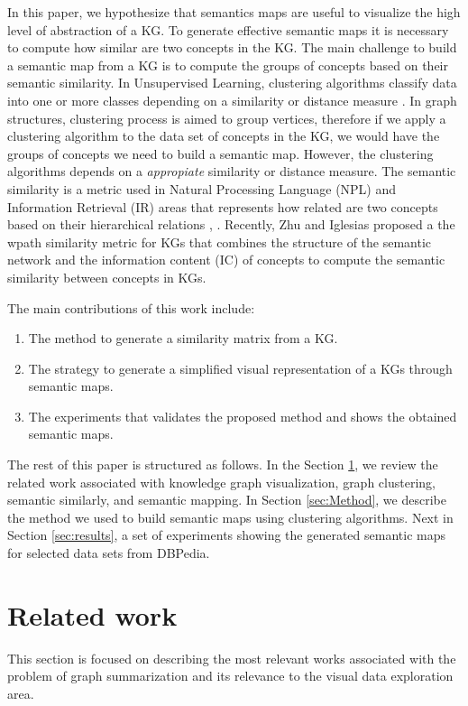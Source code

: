 \documentclass{ieeeaccess}
\begin{document}
In this paper, we hypothesize 
that semantics maps are useful to visualize the high level of abstraction of 
a KG. To generate effective semantic maps it is necessary to compute 
how similar are two concepts in the KG. The main challenge to build a semantic map
from a KG is to compute the groups of concepts based on their 
semantic similarity. In Unsupervised Learning, clustering algorithms classify data into
one or more classes depending on a similarity or distance measure \cite{SCHAEFFER200727}. In
graph structures, clustering process is aimed to group vertices, therefore if we apply a
clustering algorithm to the data set of concepts in the KG, we would have the groups of
concepts we need to build a semantic map. However, the clustering algorithms depends on a
\textit{appropiate} similarity or distance measure. The semantic similarity is a metric used
in Natural Processing Language (NPL) and Information Retrieval (IR) areas \cite{HOVY20132} that
represents how related are two concepts based on their hierarchical 
relations \cite{resnik1995using}, \cite{turney2010frequency}. Recently, Zhu and Iglesias
\cite{ZhuIglesias2017} proposed a the wpath similarity metric for KGs that combines 
the structure of the semantic network and the information content (IC) of concepts to 
compute the semantic similarity between concepts in KGs.

The main contributions of this work include:
\begin{enumerate}
    \item The method to generate a similarity matrix from a KG.
    \item The strategy to generate a simplified visual representation 
    of a KGs through semantic maps.
    \item The experiments that validates the proposed method and shows the
    obtained semantic maps.
\end{enumerate}

The rest of this paper is structured as follows. In the Section \ref{sec:related},
we review the related work associated with knowledge graph visualization, graph 
clustering, semantic similarly, and semantic mapping. In Section \ref{sec:Method}, we 
describe the method we used to build semantic maps using clustering algorithms. Next in 
Section \ref{sec:results}, a set of experiments showing the generated semantic maps for 
selected data sets from DBPedia.


\section{Related work}
\label{sec:related}
This section is focused on describing the most relevant works associated with
the problem of graph summarization and its relevance to the visual data
exploration area.
\end{document}
